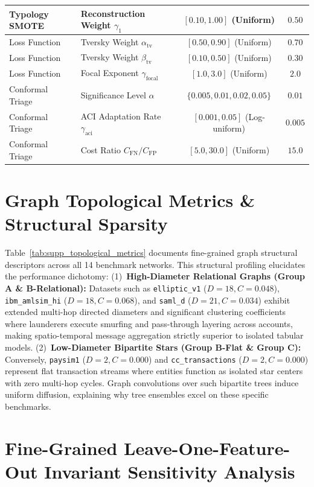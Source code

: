 \documentclass[a4paper,fleqn,twocolumn]{article}
\begin{document}
\begin{table}[htbp]
{\begin{tabular}{llcc}
Typology SMOTE & Reconstruction Weight $\gamma_1$ & $[0.10, 1.00]$ (Uniform) & $0.50$ \\
\midrule
Loss Function & Tversky Weight $\alpha_{\text{tv}}$ & $[0.50, 0.90]$ (Uniform) & $0.70$ \\
Loss Function & Tversky Weight $\beta_{\text{tv}}$ & $[0.10, 0.50]$ (Uniform) & $0.30$ \\
Loss Function & Focal Exponent $\gamma_{\text{focal}}$ & $[1.0, 3.0]$ (Uniform) & $2.0$ \\
\midrule
Conformal Triage & Significance Level $\alpha$ & $\{0.005, 0.01, 0.02, 0.05\}$ & $0.01$ \\
Conformal Triage & ACI Adaptation Rate $\gamma_{\text{aci}}$ & $[0.001, 0.05]$ (Log-uniform) & $0.005$ \\
Conformal Triage & Cost Ratio $C_{\text{FN}} / C_{\text{FP}}$ & $[5.0, 30.0]$ (Uniform) & $15.0$ \\
\bottomrule
\end{tabular}%
}
\end{table}

\section{Graph Topological Metrics \& Structural Sparsity}
\label{sec:supp_graph_topologies}

Table~\ref{tab:supp_topological_metrics} documents fine-grained graph structural descriptors across all 14 benchmark networks. This structural profiling elucidates the performance dichotomy: (1)~\textbf{High-Diameter Relational Graphs (Group A \& B-Relational):} Datasets such as \texttt{elliptic\_v1} ($D=18, C=0.048$), \texttt{ibm\_amlsim\_hi} ($D=18, C=0.068$), and \texttt{saml\_d} ($D=21, C=0.034$) exhibit extended multi-hop directed diameters and significant clustering coefficients where launderers execute smurfing and pass-through layering across accounts, making spatio-temporal message aggregation strictly superior to isolated tabular models. (2)~\textbf{Low-Diameter Bipartite Stars (Group B-Flat \& Group C):} Conversely, \texttt{paysim1} ($D=2, C=0.000$) and \texttt{cc\_transactions} ($D=2, C=0.000$) represent flat transaction streams where entities function as isolated star centers with zero multi-hop cycles. Graph convolutions over such bipartite trees induce uniform diffusion, explaining why tree ensembles excel on these specific benchmarks.


\section{Fine-Grained Leave-One-Feature-Out Invariant Sensitivity Analysis}
\label{sec:supp_feature_sensitivity}
\end{document}
